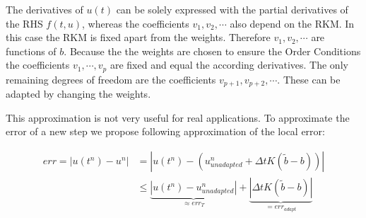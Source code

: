 \documentclass[a4paper]{article}
\numberwithin{equation}{section}
\theoremstyle{plain}
\theoremstyle{definition}
\numberwithin{theorem}{section}
\newcommand{\dt}{{\Delta t}}
\newcommand{\1}{\mathbbm{1}}
\begin{document}
The derivatives of $u(t)$ can be solely expressed with the partial derivatives of the RHS $f(t,u)$, whereas the coefficients $v_1,v_2,\cdots$ also depend on the RKM. 
In this case the RKM is fixed apart from the weights. 
Therefore $v_1,v_2,\cdots$ are functions of $b$.
Because the the weights are chosen to ensure the Order Conditions the coefficients $v_1,\cdots,v_p$ are fixed and equal the according derivatives. 
The only remaining degrees of freedom are the coefficients $v_{p+1},v_{p+2},\cdots$.
These can be adapted by changing the weights.

This approximation is not very useful for real applications. 
To approximate the error of a new step we propose following approximation of the local error:

\begin{align}
err = |u(t^n)-u^n| &= |u(t^n) - (u^n_{unadapted}+\dt K(\tilde{b}-b))| \\
 &\leq \underbrace{|u(t^n)-u^n_{unadapted}|}_{\approx err_T}+\underbrace{|\dt K(\tilde{b}-b)|}_{= err_{adapt}} \label{eq:Err}
\end{align}
\end{document}
